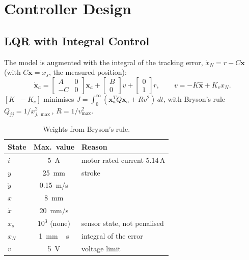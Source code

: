\section{Controller Design}\label{sec:ctrl}
\subsection{LQR with Integral Control}
The model is augmented with the integral of the tracking error, $\dot x_N = r - C\mathbf{x}$ (with $C\mathbf{x}=x_s$, the measured position):
\begin{equation}
\dot{\mathbf{x}}_a = \begin{bmatrix}A & 0\\ -C & 0\end{bmatrix}\mathbf{x}_a + \begin{bmatrix}B\\0\end{bmatrix} v
+\begin{bmatrix}0\\1\end{bmatrix} r,\qquad
v = -K\hat{\mathbf{x}} + K_e x_N.
\end{equation}
$[K\;\;-K_e]$ minimises $J=\int_0^\infty (\mathbf{x}_a^TQ\mathbf{x}_a + R v^2)\,dt$, with Bryson's rule
$Q_{jj}=1/x_{j,\max}^2$, $R = 1/v_{\max}^2$.

\begin{table}[H]\centering
\caption{Weights from Bryson's rule.}
\begin{tabular}{lcl}\toprule
State & Max.\ value & Reason\\\midrule
$i$ & \SI{5}{A} & motor rated current 5.14\,A\\
$y$ & \SI{25}{mm} & stroke\\
$\dot y$ & \SI{0.15}{m/s} & \\
$x$ & \SI{8}{mm} & \\
$\dot x$ & \SI{20}{mm/s} & \\
$x_s$ & $10^3$ (none) & sensor state, not penalised\\
$x_N$ & \SI{1}{mm\,s} & integral of the error\\
$v$ & \SI{5}{V} & voltage limit\\\bottomrule
\end{tabular}\end{table}

